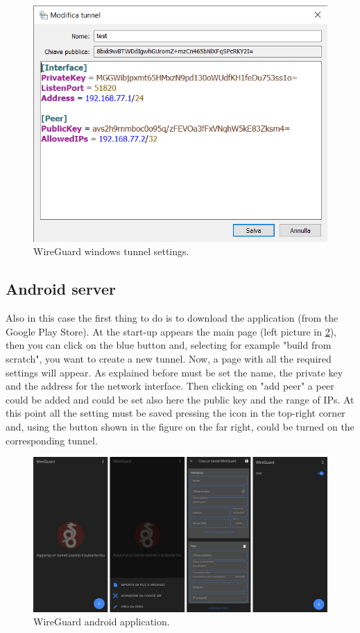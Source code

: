 \begin{figure}[H]
\vspace{0.5cm}
\centering
\includegraphics[width=\textwidth/3*2]{images/wireguard_windows_tunnel_settings.png}
\caption{WireGuard windows tunnel settings.}
\label{fig:wireguard_windows_tunnel_settings} %
\end{figure}

\subsection{Android server}
Also in this case the first thing to do is to download the application (from the Google Play Store). At the start-up appears the main page (left picture in \ref{fig:android_wireguard_main}), then you can click on the blue button and, selecting for example "build from scratch", you want to create a new tunnel. Now, a page with all the required settings will appear. As explained before must be set the name, the private key and the address for the network interface. Then clicking on "add peer" a peer could be added and could be set also here the public key and the range of IPs. At this point all the setting must be saved pressing the icon in the top-right corner and, using the button shown in the figure on the far right, could be turned on the corresponding tunnel.

\begin{figure}[H]
\vspace{0.5cm}
\includegraphics[width=\textwidth]{images/android_server_wg.png}
\caption{WireGuard android application.}
\label{fig:android_wireguard_main} %
\end{figure}


